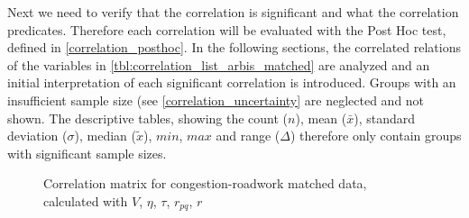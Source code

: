 Next we need to verify that the correlation is significant and what the correlation predicates. Therefore each correlation will be evaluated with the Post Hoc test, defined in \cref{correlation_posthoc}. In the following sections, the correlated relations of the variables in \cref{tbl:correlation_list_arbis_matched} are analyzed and an initial interpretation of each significant correlation is introduced. Groups with an insufficient sample size (see \cref{correlation_uncertainty} are neglected and not shown. The descriptive tables, showing the count ($n$), mean ($\bar{x}$), standard deviation ($\sigma$), median ($\tilde{x}$), $min$, $max$ and range ($\Delta$) therefore only contain groups with significant sample sizes.
\begin{figure}[!ht]
	\centering
	\caption{Correlation matrix for congestion-roadwork matched data, calculated with $V$, $\eta$, $\tau$, $r_{pq}$, $r$}
	\label{img:correlation_matrix_arbis_selected_effector_cramers}
\end{figure}


